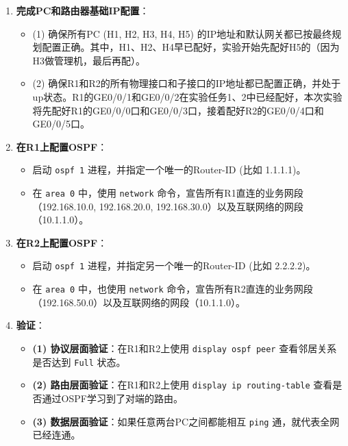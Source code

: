 \documentclass[12pt, a4paper]{article}
\begin{document}
\begin{enumerate}
    \item \textbf{完成PC和路由器基础IP配置}：
    \begin{itemize}
        \item (1) 确保所有PC (H1, H2, H3, H4, H5) 的IP地址和默认网关都已按最终规划配置正确。其中，H1、H2、H4早已配好，实验开始先配好H5的（因为H3做管理机，最后再配）。
        \item (2) 确保R1和R2的所有物理接口和子接口的IP地址都已配置正确，并处于up状态。R1的GE0/0/1和GE0/0/2在实验任务1、2中已经配好，本次实验将先配好R1的GE0/0/0口和GE0/0/3口，接着配好R2的GE0/0/4口和GE0/0/5口。
    \end{itemize}

    \item \textbf{在R1上配置OSPF}：
    \begin{itemize}
        \item 启动 \texttt{ospf 1} 进程，并指定一个唯一的Router-ID (比如 1.1.1.1)。
        \item 在 \texttt{area 0} 中，使用 \texttt{network} 命令，宣告所有R1直连的业务网段（192.168.10.0, 192.168.20.0, 192.168.30.0）以及互联网络的网段（10.1.1.0）。
    \end{itemize}

    \item \textbf{在R2上配置OSPF}：
    \begin{itemize}
        \item 启动 \texttt{ospf 1} 进程，并指定另一个唯一的Router-ID (比如 2.2.2.2)。
        \item 在 \texttt{area 0} 中，也使用 \texttt{network} 命令，宣告所有R2直连的业务网段（192.168.50.0）以及互联网络的网段（10.1.1.0）。
    \end{itemize}

    \item \textbf{验证}：
    \begin{itemize}
        \item \textbf{(1) 协议层面验证}：在R1和R2上使用 \texttt{display ospf peer} 查看邻居关系是否达到 \texttt{Full} 状态。
        \item \textbf{(2) 路由层面验证}：在R1和R2上使用 \texttt{display ip routing-table} 查看是否通过OSPF学习到了对端的路由。
        \item \textbf{(3) 数据层面验证}：如果任意两台PC之间都能相互 \texttt{ping} 通，就代表全网已经连通。
    \end{itemize}
\end{enumerate}
\end{document}
